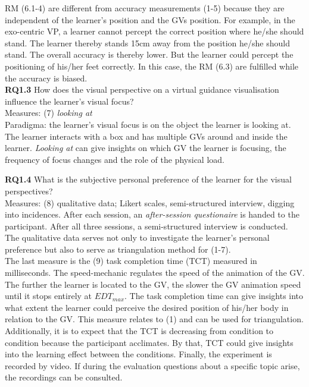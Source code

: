 RM (6.1-4) are different from accuracy measurements (1-5) because they are independent of the learner's position and the GVs position. For example, in the exo-centric VP, a learner cannot percept the correct position where he/she should stand. The learner thereby stands 15cm away from the position he/she should stand. The overall accuracy is thereby lower. But the learner could percept the positioning of his/her feet correctly. In this case, the RM (6.3) are fulfilled while the accuracy is biased.\\

\textbf{RQ1.3} How does the visual perspective on a virtual guidance visualisation influence the learner's visual focus?\\
Measures: (7) \textit{looking at}\\
Paradigma: the learner's visual focus is on the object the learner is looking at.\\
The learner interacts with a box and has multiple GVs around and inside the learner. \textit{Looking at} can give insights on which GV the learner is focusing, the frequency of focus changes and the role of the physical load.

\textbf{RQ1.4} What is the subjective personal preference of the learner for the visual perspectives?\\
Measures: (8) qualitative data; Likert scales, semi-structured interview, digging into incidences. After each session, an \textit{after-session questionaire} is handed to the participant. After all three sessions, a semi-structured interview is conducted.\\
The qualitative data serves not only to investigate the learner's personal preference but also to serve as triangulation method for (1-7).\\

The last measure is the (9) task completion time (TCT) measured in milliseconds. The speed-mechanic regulates the speed of the animation of the GV. The further the learner is located to the GV, the slower the GV animation speed until it stops entirely at $EDT_{max}$. The task completion time can give insights into what extent the learner could perceive the desired position of his/her body in relation to the GV. This measure relates to (1) and can be used for triangulation.
Additionally, it is to expect that the TCT is decreasing from condition to condition because the participant acclimates. By that, TCT could give insights into the learning effect between the conditions. Finally, the experiment is recorded by video. If during the evaluation questions about a specific topic arise, the recordings can be consulted.

